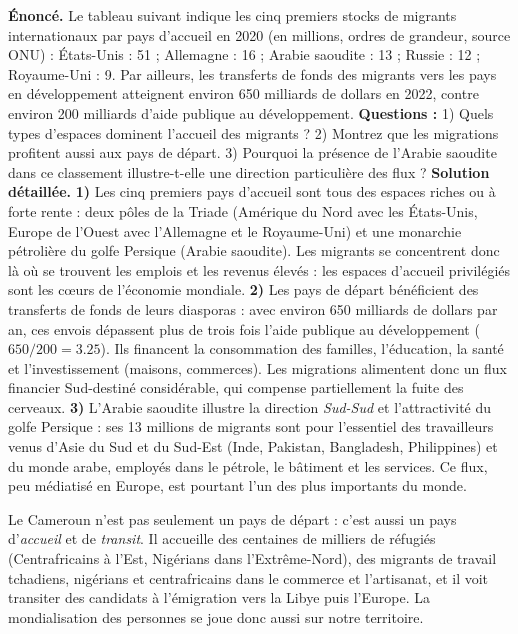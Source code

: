 \documentclass[11pt]{article}
\begin{document}
\begin{exoresolu}
\textbf{Énoncé.} Le tableau suivant indique les cinq premiers stocks de migrants internationaux par pays d'accueil en 2020 (en millions, ordres de grandeur, source ONU) : États-Unis : 51 ; Allemagne : 16 ; Arabie saoudite : 13 ; Russie : 12 ; Royaume-Uni : 9. Par ailleurs, les transferts de fonds des migrants vers les pays en développement atteignent environ 650 milliards de dollars en 2022, contre environ 200 milliards d'aide publique au développement. \textbf{Questions :} 1) Quels types d'espaces dominent l'accueil des migrants ? 2) Montrez que les migrations profitent aussi aux pays de départ. 3) Pourquoi la présence de l'Arabie saoudite dans ce classement illustre-t-elle une direction particulière des flux ?
\tcblower
\textbf{Solution détaillée.}
\textbf{1)} Les cinq premiers pays d'accueil sont tous des espaces riches ou à forte rente : deux pôles de la Triade (Amérique du Nord avec les États-Unis, Europe de l'Ouest avec l'Allemagne et le Royaume-Uni) et une monarchie pétrolière du golfe Persique (Arabie saoudite). Les migrants se concentrent donc là où se trouvent les emplois et les revenus élevés : les espaces d'accueil privilégiés sont les cœurs de l'économie mondiale.
\textbf{2)} Les pays de départ bénéficient des transferts de fonds de leurs diasporas : avec environ 650 milliards de dollars par an, ces envois dépassent plus de trois fois l'aide publique au développement ($650 / 200 = \num{3,25}$). Ils financent la consommation des familles, l'éducation, la santé et l'investissement (maisons, commerces). Les migrations alimentent donc un flux financier Sud-destiné considérable, qui compense partiellement la fuite des cerveaux.
\textbf{3)} L'Arabie saoudite illustre la direction \emph{Sud-Sud} et l'attractivité du golfe Persique : ses 13 millions de migrants sont pour l'essentiel des travailleurs venus d'Asie du Sud et du Sud-Est (Inde, Pakistan, Bangladesh, Philippines) et du monde arabe, employés dans le pétrole, le bâtiment et les services. Ce flux, peu médiatisé en Europe, est pourtant l'un des plus importants du monde.
\end{exoresolu}

\begin{savaistu}
Le Cameroun n'est pas seulement un pays de départ : c'est aussi un pays d'\emph{accueil} et de \emph{transit}. Il accueille des centaines de milliers de réfugiés (Centrafricains à l'Est, Nigérians dans l'Extrême-Nord), des migrants de travail tchadiens, nigérians et centrafricains dans le commerce et l'artisanat, et il voit transiter des candidats à l'émigration vers la Libye puis l'Europe. La mondialisation des personnes se joue donc aussi sur notre territoire.
\end{savaistu}
\end{document}
